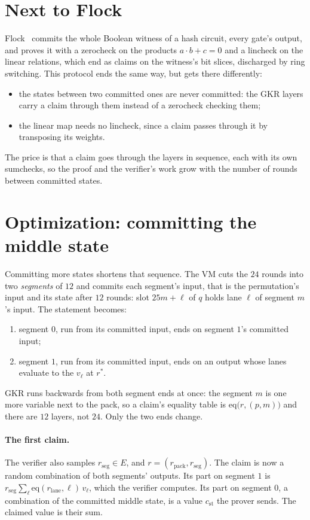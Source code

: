 \documentclass[11pt]{article}
\newcommand{\E}{E}
\newcommand{\eq}{\mathrm{eq}}
\begin{document}
\section{Next to Flock}

Flock~\cite{flock} commits the whole Boolean witness of a hash circuit, every gate's output, and proves it with a zerocheck on the products $a \cdot b + c = 0$ and a lincheck on the linear relations, which end as claims on the witness's bit slices, discharged by ring switching. This protocol ends the same way, but gets there differently:
\begin{itemize}
  \item the states between two committed ones are never committed: the GKR layers carry a claim through them instead of a zerocheck checking them;
  \item the linear map needs no lincheck, since a claim passes through it by transposing its weights.
\end{itemize}
The price is that a claim goes through the layers in sequence, each with its own sumchecks, so the proof and the verifier's work grow with the number of rounds between committed states.

\section{Optimization: committing the middle state}\label{sec:segments}

Committing more states shortens that sequence. The VM cuts the $24$ rounds into two \emph{segments} of $12$ and commits each segment's input, that is the permutation's input and its state after $12$ rounds: slot $25m + \ell$ of $q$ holds lane $\ell$ of segment $m$'s input. The statement becomes:
\begin{enumerate}[label=(\roman*)]
  \item segment $0$, run from its committed input, ends on segment $1$'s committed input;
  \item segment $1$, run from its committed input, ends on an output whose lanes evaluate to the $v_\ell$ at $r^*$.
\end{enumerate}
GKR runs backwards from both segment ends at once: the segment $m$ is one more variable next to the pack, so a claim's equality table is $\eq\bigl(r, (p, m)\bigr)$ and there are $12$ layers, not $24$. Only the two ends change.

\paragraph{The first claim.} The verifier also samples $r_{\mathrm{seg}} \in \E$, and $r = (r_{\mathrm{pack}}, r_{\mathrm{seg}})$. The claim is now a random combination of both segments' outputs. Its part on segment $1$ is $r_{\mathrm{seg}} \sum_\ell \eq(r_{\mathrm{lane}}, \ell)\, v_\ell$, which the verifier computes. Its part on segment $0$, a combination of the committed middle state, is a value $c_{\mathrm{st}}$ the prover sends. The claimed value is their sum.
\end{document}
